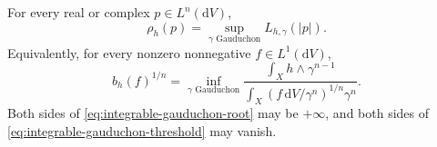 \begin{theorem}\label{thm:integrable-gauduchon-formula}
For every real or complex $p\in L^n(\mathrm{d}V)$,
\begin{equation}\label{eq:integrable-gauduchon-root}
 \rho_h(p)=\sup_{\gamma\text{ Gauduchon}}L_{h,\gamma}(|p|).
\end{equation}
Equivalently, for every nonzero nonnegative $f\in L^1(\mathrm{d}V)$,
\begin{equation}\label{eq:integrable-gauduchon-threshold}
 b_h(f)^{1/n}=
 \inf_{\gamma\text{ Gauduchon}}
 \frac{\displaystyle\int_Xh\wedge\gamma^{n-1}}
      {\displaystyle\int_X(f\,\mathrm{d}V/\gamma^n)^{1/n}\gamma^n}.
\end{equation}
Both sides of \eqref{eq:integrable-gauduchon-root} may be $+\infty$, and both sides of \eqref{eq:integrable-gauduchon-threshold} may vanish.
\end{theorem}
